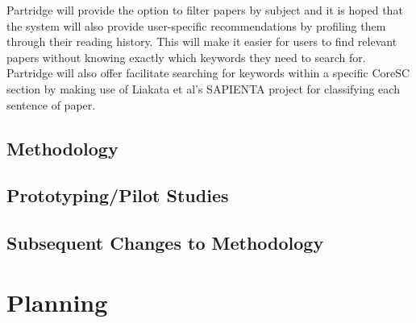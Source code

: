 \documentclass[12pt,a4paper]{article}
\begin{document}
Partridge will provide the option to filter papers by subject and it is hoped
that the system will also provide user-specific recommendations by profiling
them through their reading history. This will make it easier for users to find
relevant papers without knowing exactly which keywords they need to search for.
Partridge will also offer facilitate searching for keywords within a specific
CoreSC section by making use of Liakata et al's SAPIENTA project for
classifying each sentence of paper. 


\subsection{Methodology}

\subsection{Prototyping/Pilot Studies}

\subsection{Subsequent Changes to Methodology}

\section{Planning}

\pagebreak


\end{document}
